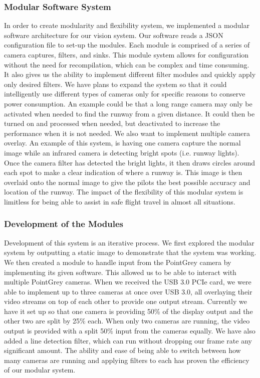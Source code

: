 \documentclass[letterpaper,10pt,titlepage]{IEEEtran}
\begin{document}
   \subsubsection{Modular Software System}
   In order to create modularity and flexibility system, we implemented a modular software architecture for our vision system. Our software reads a JSON configuration file to set-up the modules. Each module is comprised of a series of camera captures, filters, and sinks. This module system allows for configuration without the need for recompilation, which can be complex and time consuming. It also gives us the ability to implement different filter modules and quickly apply only desired filters. We have plans to expand the system so that it could intelligently use different types of cameras only for specific reasons to conserve power consumption. An example could be that a long range camera may only be activated when needed to find the runway from a given distance. It could then be turned on and processed when needed, but deactivated to increase the performance when it is not needed. We also want to implement multiple camera overlay. An example of this system, is having one camera capture the normal image while an infrared camera is detecting bright spots (i.e. runway lights). Once the camera filter has detected the bright lights, it then draws circles around each spot to make a clear indication of where a runway is. This image is then overlaid onto the normal image to give the pilots the best possible accuracy and location of the runway. The impact of the flexibility of this modular system is limitless for being able to assist in safe flight travel in almost all situations.\\ 
   
   \subsubsection{Development of the Modules}
Development of this system is an iterative process. We first explored the modular system by outputting a static image to demonstrate that the system was working. We then created a module to handle input from the PointGrey camera by implementing its given software. This allowed us to be able to interact with multiple PointGrey cameras. When we received the USB 3.0 PCIe card, we were able to implement up to three cameras at once over USB 3.0, all overlaying their video streams on top of each other to provide one output stream. Currently we have it set up so that one camera is providing 50\% of the display output and the other two are split by 25\% each. When only two cameras are running, the video output is provided with a split 50\% input from the cameras equally. We have also added a line detection filter, which can run without dropping our frame rate any significant amount. The ability and ease of being able to switch between how many cameras are running and applying filters to each has proven the efficiency of our modular system. 
   
\end{document}

